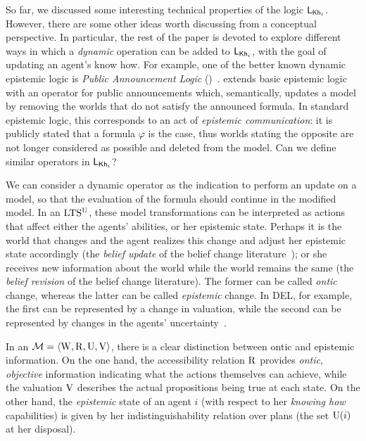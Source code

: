 So far, we discussed some interesting technical properties of the logic $\mathsf{L}_{{\sf Kh}_i}$. However, there are some other ideas worth discussing from a conceptual perspective. In particular, the rest of the paper is devoted to explore different ways in which a \emph{dynamic} operation can be added to $\mathsf{L}_{{\sf Kh}_i}$, with the goal of updating an agent's know how.   For example, one of the better known dynamic epistemic logic is \emph{Public Announcement Logic} (\PAL)~\cite{Plaza89:lopc}.  \PAL extends basic epistemic logic with an operator for public announcements which, semantically, updates a model by removing the worlds that do not satisfy the announced formula. In standard epistemic logic, this corresponds to an act of \emph{epistemic communication}: it is publicly stated that a formula $\varphi$ is the case, thus worlds stating the opposite are not longer considered as possible and deleted from the model.  Can we define similar operators in $\mathsf{L}_{{\sf Kh}_i}$?

We can consider a dynamic operator as the indication to perform an update on a model, so that the evaluation of the formula should continue in the modified model.  In an $\textup{LTS$^\text{\textup{U}}$}$, these model transformations can be interpreted as actions that affect either the agents' abilities, or her epistemic state. 
Perhaps it is the world that changes and the agent realizes this change and adjust her epistemic state accordingly (the \emph{belief update} of the belief change literature~\cite{sep-logic-belief-revision}); or she receives new information about the world while the world remains the same (the \emph{belief revision} of the belief change literature). The former can be called \emph{ontic} change, whereas the latter can be called \emph{epistemic} change. In DEL, for example, the first can be represented by a change in valuation, while the second can be represented by changes in the agents' uncertainty~\cite{vanDitmarschKooi2008}.

In an \ults $\mathcal{M}=\langle \operatorname{W},\operatorname{R},\operatorname{U},\operatorname{V} \rangle$, there is a clear distinction between ontic and epistemic information. On the one hand, the accessibility relation $\operatorname{R}$ provides \emph{ontic}, \emph{objective} information indicating what the actions themselves can achieve, while the valuation $\operatorname{V}$ describes the actual propositions being true at each state. On the other hand, the \emph{epistemic} state of an agent $i$ (with respect to her \emph{knowing how} capabilities) is given by her indistinguishability relation over plans (the set $\operatorname{U}(i)$ at her disposal). 

